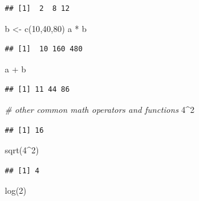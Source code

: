 \documentclass[
  12pt,
]{style/krantz}
\newenvironment{Shaded}{\begin{snugshade}}{\end{snugshade}}
\newcommand{\CommentTok}[1]{\textcolor[rgb]{0.56,0.35,0.01}{\textit{#1}}}
\newcommand{\DecValTok}[1]{\textcolor[rgb]{0.00,0.00,0.81}{#1}}
\newcommand{\FunctionTok}[1]{\textcolor[rgb]{0.00,0.00,0.00}{#1}}
\newcommand{\NormalTok}[1]{#1}
\newcommand{\OtherTok}[1]{\textcolor[rgb]{0.56,0.35,0.01}{#1}}
\newcommand{\SpecialCharTok}[1]{\textcolor[rgb]{0.00,0.00,0.00}{#1}}
\begin{document}
\begin{verbatim}
## [1]  2  8 12
\end{verbatim}

\begin{Shaded}
\begin{Highlighting}[]
\NormalTok{b }\OtherTok{\textless{}{-}} \FunctionTok{c}\NormalTok{(}\DecValTok{10}\NormalTok{,}\DecValTok{40}\NormalTok{,}\DecValTok{80}\NormalTok{)}
\NormalTok{a }\SpecialCharTok{*}\NormalTok{ b}
\end{Highlighting}
\end{Shaded}

\begin{verbatim}
## [1]  10 160 480
\end{verbatim}

\begin{Shaded}
\begin{Highlighting}[]
\NormalTok{a }\SpecialCharTok{+}\NormalTok{ b }
\end{Highlighting}
\end{Shaded}

\begin{verbatim}
## [1] 11 44 86
\end{verbatim}

\begin{Shaded}
\begin{Highlighting}[]
\CommentTok{\# other common math operators and functions}
\DecValTok{4}\SpecialCharTok{\^{}}\DecValTok{2}
\end{Highlighting}
\end{Shaded}

\begin{verbatim}
## [1] 16
\end{verbatim}

\begin{Shaded}
\begin{Highlighting}[]
\FunctionTok{sqrt}\NormalTok{(}\DecValTok{4}\SpecialCharTok{\^{}}\DecValTok{2}\NormalTok{)}
\end{Highlighting}
\end{Shaded}

\begin{verbatim}
## [1] 4
\end{verbatim}

\begin{Shaded}
\begin{Highlighting}[]
\FunctionTok{log}\NormalTok{(}\DecValTok{2}\NormalTok{)}
\end{Highlighting}
\end{Shaded}
\end{document}
